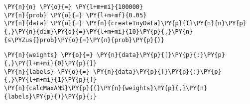 
{\par%
\vspace{-1\baselineskip}%
}%
\begin{notebookcell}[]%
\begin{addmargin}[\cellleftmargin]{0em}%
{\smaller%
\par%
%
\vspace{-1\smallerfontscale}%
\begin{Verbatim}[commandchars=\\\{\}]
\PY{n}{n} \PY{o}{=} \PY{l+m+mi}{100000}
\PY{n}{prob} \PY{o}{=} \PY{l+m+mf}{0.05}
\PY{n}{data} \PY{o}{=} \PY{n}{createToyData}\PY{p}{(}\PY{n}{n}\PY{p}{,}\PY{n}{dim}\PY{o}{=}\PY{l+m+mi}{10}\PY{p}{,}\PY{n}{s\PYZus{}prob}\PY{o}{=}\PY{n}{prob}\PY{p}{)}
\end{Verbatim}
%
\par%
\vspace{-1\smallerfontscale}}%
\end{addmargin}
\end{notebookcell}



{\par%
\vspace{-1\baselineskip}%
}%
\begin{notebookcell}[]%
\begin{addmargin}[\cellleftmargin]{0em}%
{\smaller%
\par%
%
\vspace{-1\smallerfontscale}%
\begin{Verbatim}[commandchars=\\\{\}]
\PY{n}{weights} \PY{o}{=} \PY{n}{data}\PY{p}{[}\PY{p}{:}\PY{p}{,}\PY{l+m+mi}{0}\PY{p}{]}
\PY{n}{labels} \PY{o}{=} \PY{n}{data}\PY{p}{[}\PY{p}{:}\PY{p}{,}\PY{l+m+mi}{1}\PY{p}{]}
\PY{n}{calcMaxAMS}\PY{p}{(}\PY{n}{weights}\PY{p}{,}\PY{n}{labels}\PY{p}{)}\PY{p}{;}
\end{Verbatim}
%
\par%
\vspace{-1\smallerfontscale}}%
\end{addmargin}
\end{notebookcell}

